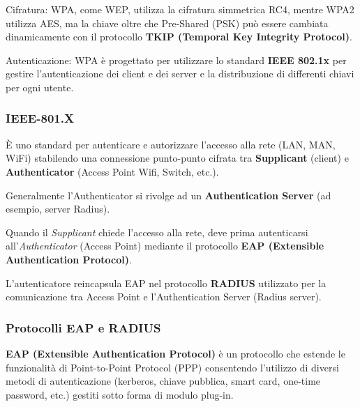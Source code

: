             Cifratura: WPA, come WEP, utilizza la cifratura simmetrica RC4, mentre WPA2 utilizza AES, ma la chiave oltre che Pre-Shared (PSK) può essere cambiata dinamicamente con il protocollo \textbf{TKIP (Temporal Key Integrity Protocol)}.
        
            Autenticazione: WPA è progettato per utilizzare lo standard \textbf{IEEE 802.1x} per gestire l'autenticazione dei client e dei server e la distribuzione di differenti chiavi per ogni utente.
        
        \subsubsection{IEEE-801.X}
            È uno standard per autenticare e autorizzare l'accesso alla rete (LAN, MAN, WiFi) stabilendo una connessione punto-punto cifrata tra \textbf{Supplicant} (client) e \textbf{Authenticator} (Access Point Wifi, Switch, etc.).
        
            Generalmente l'Authenticator si rivolge ad un \textbf{Authentication Server} (ad esempio, server Radius).
        
            Quando il \textit{Supplicant} chiede l'accesso alla rete, deve prima autenticarsi all'\textit{Authenticator} (Access Point) mediante il protocollo \textbf{EAP (Extensible Authentication Protocol)}.
        
            L'autenticatore reincapsula EAP nel protocollo \textbf{RADIUS} utilizzato per la comunicazione tra Access Point e l'Authentication Server (Radius server).

        \subsubsection{Protocolli EAP e RADIUS}
            \textbf{EAP (Extensible Authentication Protocol)} è un protocollo che estende le funzionalità di Point-to-Point Protocol (PPP) consentendo l'utilizzo di diversi metodi di autenticazione (kerberos, chiave pubblica, smart card, one-time password, etc.) gestiti sotto forma di modulo plug-in.
        

